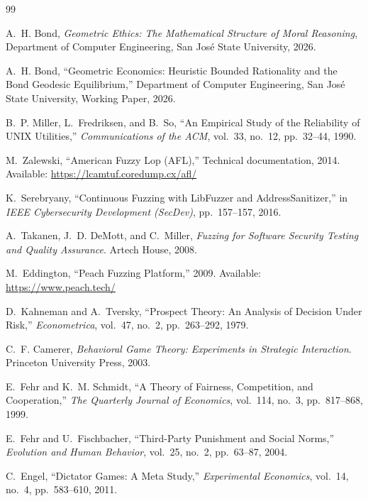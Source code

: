 \documentclass[12pt]{article}
\begin{document}
\begin{thebibliography}{99}

A.~H. Bond, \emph{Geometric Ethics: The Mathematical Structure of Moral Reasoning}, Department of Computer Engineering, San Jos\'{e} State University, 2026.

A.~H. Bond, ``Geometric Economics: Heuristic Bounded Rationality and the Bond Geodesic Equilibrium,'' Department of Computer Engineering, San Jos\'{e} State University, Working Paper, 2026.

B.~P. Miller, L.~Fredriksen, and B.~So, ``An Empirical Study of the Reliability of UNIX Utilities,'' \emph{Communications of the ACM}, vol.~33, no.~12, pp.~32--44, 1990.

M.~Zalewski, ``American Fuzzy Lop (AFL),'' Technical documentation, 2014. Available: \url{https://lcamtuf.coredump.cx/afl/}

K.~Serebryany, ``Continuous Fuzzing with LibFuzzer and AddressSanitizer,'' in \emph{IEEE Cybersecurity Development (SecDev)}, pp.~157--157, 2016.

A.~Takanen, J.~D. DeMott, and C.~Miller, \emph{Fuzzing for Software Security Testing and Quality Assurance}. Artech House, 2008.

M.~Eddington, ``Peach Fuzzing Platform,'' 2009. Available: \url{https://www.peach.tech/}

D.~Kahneman and A.~Tversky, ``Prospect Theory: An Analysis of Decision Under Risk,'' \emph{Econometrica}, vol.~47, no.~2, pp.~263--292, 1979.

C.~F. Camerer, \emph{Behavioral Game Theory: Experiments in Strategic Interaction}. Princeton University Press, 2003.

E.~Fehr and K.~M. Schmidt, ``A Theory of Fairness, Competition, and Cooperation,'' \emph{The Quarterly Journal of Economics}, vol.~114, no.~3, pp.~817--868, 1999.

E.~Fehr and U.~Fischbacher, ``Third-Party Punishment and Social Norms,'' \emph{Evolution and Human Behavior}, vol.~25, no.~2, pp.~63--87, 2004.

C.~Engel, ``Dictator Games: A Meta Study,'' \emph{Experimental Economics}, vol.~14, no.~4, pp.~583--610, 2011.


\end{thebibliography}
\end{document}
